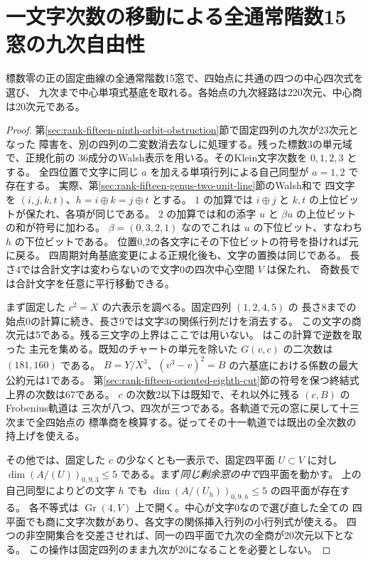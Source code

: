 \section{一文字次数の移動による全通常階数15窓の九次自由性}
\label{sec:rank-fifteen-ninth-character}
\begin{theorem}\label{thm:rank-fifteen-ninth-character}
標数零の正の固定曲線の全通常階数15窓で、四始点に共通の四つの中心四次式を選び、
九次まで中心単項式基底を取れる。各始点の九次経路は220次元、中心商は20次元である。
\end{theorem}
\begin{proof}
第\ref{sec:rank-fifteen-ninth-orbit-obstruction}節で固定四列の九次が23次元となった
障害を、別の四列の二変数消去なしに処理する。残った標数3の単元域で、正規化前の
36成分のWalsh表示を用いる。そのKlein文字次数を $0,1,2,3$ とする。
全四位置で文字に同じ $a$ を加える単項行列による自己同型が $a=1,2$ で存在する。
実際、第\ref{sec:rank-fifteen-genus-two-unit-line}節のWalsh和で
四文字を $(i,j,k,t)$、$h=i\oplus k=j\oplus t$ とする。
$1$ の加算では $i\oplus j$ と $k,t$ の上位ビットが保たれ、各項が同じである。
$2$ の加算では和の添字 $u$ と $\beta u$ の上位ビットの和が符号に加わる。
$\beta=(0,3,2,1)$ なのでこれは $u$ の下位ビット、すなわち $h$ の下位ビットである。
位置0,2の各文字にその下位ビットの符号を掛ければ元に戻る。
四周期対角基底変更による正規化後も、文字の置換は同じである。
長さ4では合計文字は変わらないので文字0の四次中心空間 $V$ は保たれ、
奇数長では合計文字を任意に平行移動できる。

まず固定した $c^2=X$ の六表示を調べる。固定四列 $(1,2,4,5)$ の
長さ8までの始点0の計算に続き、長さ9では文字3の関係行列だけを消去する。
この文字の商次元は5である。残る三文字の上界はここでは用いない。
 はこの計算で逆数を取った
主元を集める。既知のチャートの単元を除いた $G(v,c)$ の二次数は $(181,160)$ である。
$B=Y/X^3$、$(v^3-v)^2=B$ の六基底における係数の最大公約元は1である。
第\ref{sec:rank-fifteen-oriented-eighth-cut}節の符号を保つ終結式上界の次数は67である。
$c$ の次数2以下は既知で、それ以外に残る $(c,B)$ のFrobenius軌道は
三次が八つ、四次が三つである。各軌道で元の窓に戻して十三次まで全四始点の
標準商を検算する。従ってその十一軌道では既出の全次数の持上げを使える。

その他では、固定した $c$ の少なくとも一表示で、固定四平面 $U\subset V$ に対し
$\dim (A/(U))_{0,9,3}\le5$ である。まず\emph{同じ剰余窓の中で}四平面を動かす。
上の自己同型によりどの文字 $h$ でも $\dim(A/(U_h))_{0,9,h}\le5$ の四平面が存在する。
各不等式は $\operatorname{Gr}(4,V)$ 上で開く。中心が文字0なので選び直した全ての
四平面でも商に文字次数があり、各文字の関係挿入行列の小行列式が使える。
四つの非空開集合を交差させれば、同一の四平面で九次の全商が20次元以下となる。
この操作は固定四列のまま九次が20になることを必要としない。


\end{proof}
